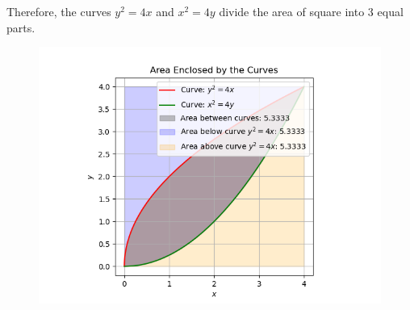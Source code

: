 \documentclass[journal]{IEEEtran}
\begin{document}
Therefore, the curves $y^2=4x$ and $x^2=4y$ divide the area of square into 3 equal parts.
\begin{figure}[h!]
   \centering
   \includegraphics[width=\linewidth]{figs/figure_1.png}
   \label{stemplot}
   \caption{}
\end{figure}
\end{document}
